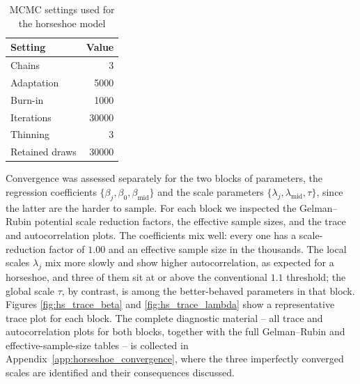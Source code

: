 \begin{table}[htbp]
  \centering
  \begin{minipage}[t]{0.30\textwidth}
    \vspace{0pt}
    \small
    \centering
    \begin{tabular}{lr}
      \toprule
      Setting & Value \\
      \midrule
      Chains            & 3 \\
      Adaptation        & 5000 \\
      Burn-in           & 1000 \\
      Iterations        & 30000 \\
      Thinning          & 3 \\
      Retained draws    & 30000 \\
      \bottomrule
    \end{tabular}
    \caption{MCMC settings used for the horseshoe model}
    \label{tab:hs_mcmc_settings}
  \end{minipage}
  \hfill
  \begin{minipage}[t]{0.66\textwidth}
    \vspace{0pt}
    Convergence was assessed separately for the two blocks of parameters, the
    regression coefficients $\{\beta_j, \beta_0, \beta_{\text{mid}}\}$ and the scale
    parameters $\{\lambda_j, \lambda_{\text{mid}}, \tau\}$, since the latter are the
    harder to sample. For each block we inspected the Gelman--Rubin potential scale
    reduction factors, the effective sample sizes, and the trace and autocorrelation
    plots. The coefficients mix well: every one has a scale-reduction factor of $1.00$
    and an effective sample size in the thousands. The local scales $\lambda_j$ mix
    more slowly and show higher autocorrelation, as expected for a horseshoe, and
    three of them sit at or above the conventional $1.1$ threshold; the global scale
    $\tau$, by contrast, is among the better-behaved parameters in that block.
    Figures \ref{fig:hs_trace_beta} and \ref{fig:hs_trace_lambda} show a
    representative trace plot for each block. The complete diagnostic material --
    all trace and autocorrelation plots for both blocks, together with the full
    Gelman--Rubin and effective-sample-size tables -- is collected in
    Appendix~\ref{app:horseshoe_convergence}, where the three imperfectly converged
    scales are identified and their consequences discussed.
  \end{minipage}
\end{table}

